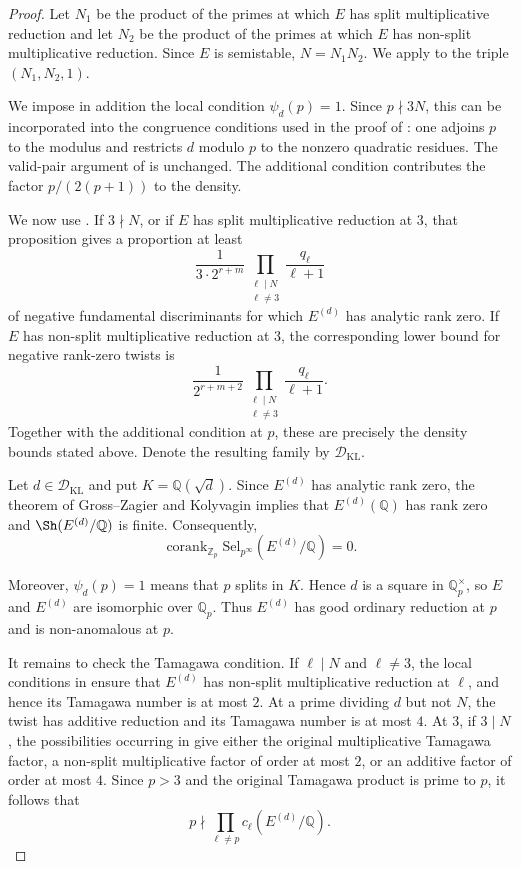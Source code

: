 \documentclass[12pt]{amsart}
\newcommand{\Z}{\mathbb{Z}}
\newcommand{\Q}{\mathbb{Q}}
\newcommand{\Sel}{\mathrm{Sel}}
\newcommand{\op}[1]{\operatorname{#1}}
\numberwithin{equation}{section}
\begin{document}
\begin{proof}
Let $N_1$ be the product of the primes at which $E$ has split multiplicative reduction and let $N_2$ be the product of the primes at which $E$ has non-split multiplicative reduction. Since $E$ is semistable, $N=N_1N_2$. We apply \cite[Theorem~9.5]{kriz-li} to the triple $(N_1,N_2,1)$.

We impose in addition the local condition $\psi_d(p)=1$. Since $p\nmid3N$, this can be incorporated into the congruence conditions used in the proof of \cite[Theorem~9.5]{kriz-li}: one adjoins $p$ to the modulus and restricts $d$ modulo $p$ to the nonzero quadratic residues. The valid-pair argument of \cite[Proposition~9.3]{kriz-li} is unchanged. The additional condition contributes the factor $p/(2(p+1))$ to the density.

We now use \cite[Proposition~9.7]{kriz-li}. If $3\nmid N$, or if $E$ has split multiplicative reduction at $3$, that proposition gives a proportion at least
\[
\frac{1}{3\cdot2^{r+m}}
\prod_{\substack{\ell\mid N\\ \ell\neq3}}
\frac{q_\ell}{\ell+1}
\]
of negative fundamental discriminants for which $E^{(d)}$ has analytic rank zero. If $E$ has non-split multiplicative reduction at $3$, the corresponding lower bound for negative rank-zero twists is
\[
\frac{1}{2^{r+m+2}}
\prod_{\substack{\ell\mid N\\ \ell\neq3}}
\frac{q_\ell}{\ell+1}.
\]
Together with the additional condition at $p$, these are precisely the density bounds stated above. Denote the resulting family by $\mathcal D_{\mathrm{KL}}$.

Let $d\in\mathcal D_{\mathrm{KL}}$ and put $K=\Q(\sqrt d)$. Since $E^{(d)}$ has analytic rank zero, the theorem of Gross--Zagier and Kolyvagin implies that $E^{(d)}(\Q)$ has rank zero and $\Sh(E^{(d)}/\Q)$ is finite. Consequently,
\[
\op{corank}_{\Z_p}\Sel_{p^\infty}(E^{(d)}/\Q)=0.
\]

Moreover, $\psi_d(p)=1$ means that $p$ splits in $K$. Hence $d$ is a square in $\Q_p^\times$, so $E$ and $E^{(d)}$ are isomorphic over $\Q_p$. Thus $E^{(d)}$ has good ordinary reduction at $p$ and is non-anomalous at $p$.

It remains to check the Tamagawa condition. If $\ell\mid N$ and $\ell\neq3$, the local conditions in \cite[Theorem~9.5]{kriz-li} ensure that $E^{(d)}$ has non-split multiplicative reduction at $\ell$, and hence its Tamagawa number is at most $2$. At a prime dividing $d$ but not $N$, the twist has additive reduction and its Tamagawa number is at most $4$. At $3$, if $3\mid N$, the possibilities occurring in \cite[Proposition~9.7]{kriz-li} give either the original multiplicative Tamagawa factor, a non-split multiplicative factor of order at most $2$, or an additive factor of order at most $4$. Since $p>3$ and the original Tamagawa product is prime to $p$, it follows that
\[
p\nmid\prod_{\ell\neq p}c_\ell(E^{(d)}/\Q).
\]


\end{proof}
\end{document}
